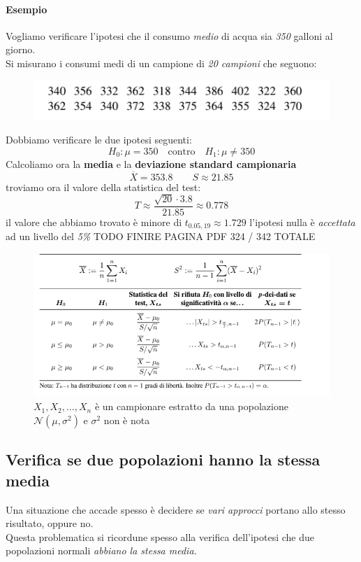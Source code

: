 \documentclass[]{article}
\begin{document}
    \paragraph{Esempio} Vogliamo verificare l'ipotesi che il consumo \textit{medio} di acqua sia \textit{350} galloni al giorno. \\
    Si misurano i consumi medi di un campione di \textit{20 campioni} che seguono:
    \begin{figure}[H]
        \includegraphics[width=\textwidth]{images/boh_8.png}
    \end{figure}
    Dobbiamo verificare le due ipotesi seguenti:
    \[ H_0 : \mu = 350 \quad \text{contro} \quad H_1 : \mu \not = 350 \]
    Calcoliamo ora la \textbf{media} e la \textbf{deviazione standard campionaria}
    \[ \overline{X} = 353.8 \qquad S \approx 21.85 \]
    troviamo ora il valore della statistica del test:
    \[ T \approx \frac{\sqrt{20} \cdot 3.8}{21.85} \approx 0.778 \]
    il valore che abbiamo trovato è minore di $t_{0.05, 19} \approx 1.729$ l'ipotesi nulla è \textit{accettata} ad un livello del \textit{5\%}
    TODO FINIRE PAGINA PDF 324 / 342 TOTALE
    \begin{figure}[H]
        \caption{$X_1, X_2, \ldots, X_n$ è un campionare estratto da una popolazione $\mathcal{N}(\mu, \sigma^2)$ e $\sigma^2$ non è nota}
        \includegraphics[width=\textwidth]{images/boh_9.png}
    \end{figure}
    \subsection{Verifica se due popolazioni hanno la stessa media}
    Una situazione che accade spesso è decidere se \textit{vari approcci} portano allo stesso risultato, oppure no. \\
    Questa problematica si ricordune spesso alla verifica dell'ipotesi che due popolazioni normali \textit{abbiano la stessa media.}
\end{document}
